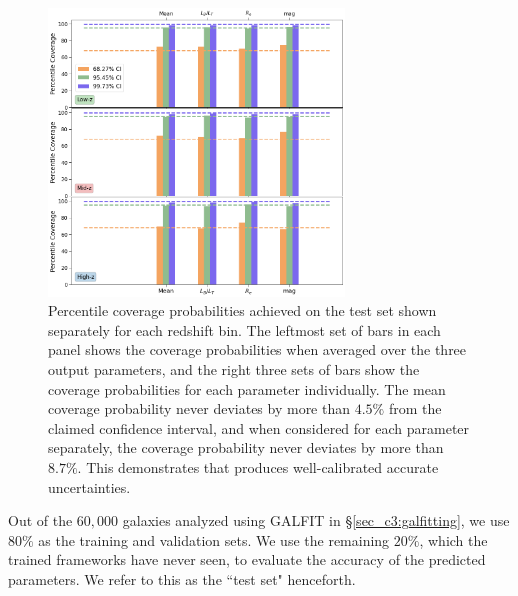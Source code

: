\begin{figure}[htb]
    \centering
    \includegraphics[width = 0.7\textwidth]{cov_prob_all_z.png}
    \caption{Percentile coverage probabilities achieved on the test set shown separately for each redshift bin. The leftmost set of bars in each panel shows the coverage probabilities when averaged over the three output parameters, and the right three sets of bars show the coverage probabilities for each parameter individually. The mean coverage probability never deviates by more than $4.5\%$ from the claimed confidence interval, and when considered for each parameter separately, the coverage probability never deviates by more than $8.7\%$. This demonstrates that \gampen{} produces well-calibrated accurate uncertainties.}
    \label{fig_c3:cov_prob_all_z}
\end{figure}

Out of the $60,000$ galaxies analyzed using GALFIT in \S \ref{sec_c3:galfitting}, we use $80\%$ as the training and validation sets. We use the remaining $20\%$, which the trained \gampen{} frameworks have never seen, to evaluate the accuracy of the predicted parameters. We refer to this as the ``test set" henceforth.

